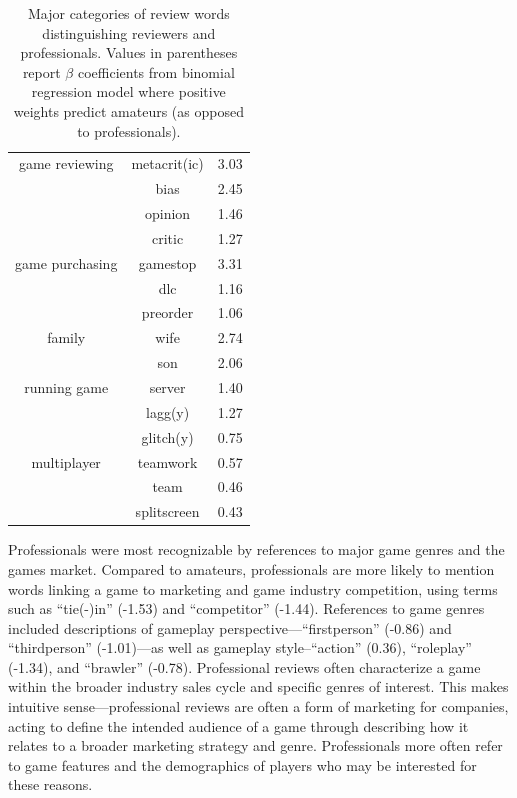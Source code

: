 \documentclass[letterpaper]{article}
\begin{document}
\begin{table}[tb]
\begin{tabular}{|c|cc|}
\hline game reviewing 
& metacrit(ic) & 3.03 \\ 
& bias & 2.45 \\ 
& opinion & 1.46 \\ 
& critic & 1.27 \\ 

\hline game purchasing 
& gamestop & 3.31 \\ 
& dlc & 1.16 \\ 
& preorder & 1.06 \\ 

\hline family 
& wife & 2.74 \\ 
& son & 2.06 \\ 

\hline running game 
& server & 1.40 \\ 
& lagg(y) & 1.27 \\ 
& glitch(y) & 0.75 \\ 

\hline multiplayer 
& teamwork & 0.57 \\ 
& team & 0.46 \\ 
& splitscreen & 0.43 \\
\hline 
\end{tabular}
\caption{Major categories of review words distinguishing reviewers and professionals. Values in parentheses report $\beta$ coefficients from binomial regression model where positive weights predict amateurs (as opposed to professionals).}
\label{tab:user_classification_coef}
\end{table}

Professionals were most recognizable by references to major game genres and the games market. Compared to amateurs, professionals are more likely to mention words linking a game to marketing and game industry competition, using terms such as ``tie(-)in'' (-1.53) and ``competitor'' (-1.44). References to game genres included descriptions of gameplay perspective---``firstperson'' (-0.86) and ``thirdperson'' (-1.01)---as well as gameplay style--``action'' (0.36), ``roleplay'' (-1.34),  and ``brawler'' (-0.78). Professional reviews often characterize a game within the broader industry sales cycle and specific genres of interest. This makes intuitive sense---professional reviews are often a form of marketing for companies, acting to define the intended audience of a game through describing how it relates to a broader marketing strategy and genre. Professionals more often refer to game features and the demographics of players who may be interested for these reasons.
\end{document}
